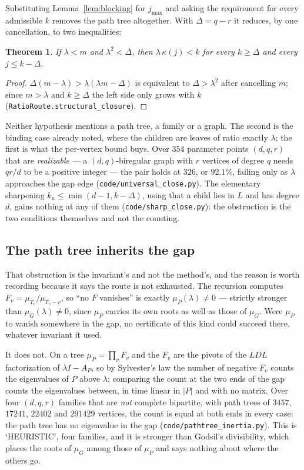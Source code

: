 \documentclass[11pt]{article}
\newtheorem{theorem}{Theorem}
\theoremstyle{remark}
\begin{document}
Substituting Lemma~\ref{lem:blocking} for $j_{\max}$ and asking the requirement for every
admissible $k$ removes the path tree altogether. With $\Delta=q-r$ it reduces, by one
cancellation, to two inequalities:

\begin{theorem}\label{thm:structclose}
If $\lambda<m$ and $\lambda^2<\Delta$, then $\lambda\,\kappa(j)<k$ for every $k\ge\Delta$ and
every $j\le k-\Delta$.
\end{theorem}

\begin{proof}
$\Delta(m-\lambda)>\lambda(\lambda m-\Delta)$ is equivalent to $\Delta>\lambda^2$ after
cancelling $m$; since $m>\lambda$ and $k\ge\Delta$ the left side only grows with $k$
(\texttt{RatioRoute.structural\_closure}).
\end{proof}

Neither hypothesis mentions a path tree, a family or a graph. The second is the binding case
already noted, where the children are leaves of ratio exactly $\lambda$; the first is what the
per-vertex bound buys. Over $354$ parameter points $(d,q,r)$ that are \emph{realizable} --- a
$(d,q)$-biregular graph with $r$ vertices of degree $q$ needs $qr/d$ to be a positive integer ---
the pair holds at $326$, or $92.1\%$, failing only as $\lambda$ approaches the gap edge
(\texttt{code/universal\_close.py}). The elementary sharpening $k_u\le\min(d-1,k-\Delta)$, using
that a child lies in $L$ and has degree $d$, gains nothing at any of them
(\texttt{code/sharp\_close.py}): the obstruction is the two conditions themselves and not the
counting.

\subsection{The path tree inherits the gap}\label{sec:inherit}

That obstruction is the invariant's and not the method's, and the reason is worth recording
because it says the route is not exhausted. The recursion computes $F_v=\mu_{T_v}/\mu_{T_v-v}$,
so ``no $F$ vanishes'' is exactly $\mu_P(\lambda)\ne0$ --- strictly stronger than
$\mu_G(\lambda)\ne0$, since $\mu_P$ carries its own roots as well as those of $\mu_G$. Were
$\mu_P$ to vanish somewhere in the gap, no certificate of this kind could succeed there,
whatever invariant it used.

It does not. On a tree $\mu_P=\prod_vF_v$ and the $F_v$ are the pivots of the $LDL$ factorization
of $\lambda I-A_P$, so by Sylvester's law the number of negative $F_v$ counts the eigenvalues of
$P$ above $\lambda$; comparing the count at the two ends of the gap counts the eigenvalues
between, in time linear in $|P|$ and with no matrix. Over four $(d,q,r)$ families that are
\emph{not} complete bipartite, with path trees of $3457$, $17241$, $22402$ and $291429$ vertices,
the count is equal at both ends in every case: the path tree has no eigenvalue in the gap
(\texttt{code/pathtree\_inertia.py}). This is `HEURISTIC', four families, and it is stronger than
Godsil's divisibility, which places the roots of $\mu_G$ among those of $\mu_P$ and says nothing
about where the others go.
\end{document}
